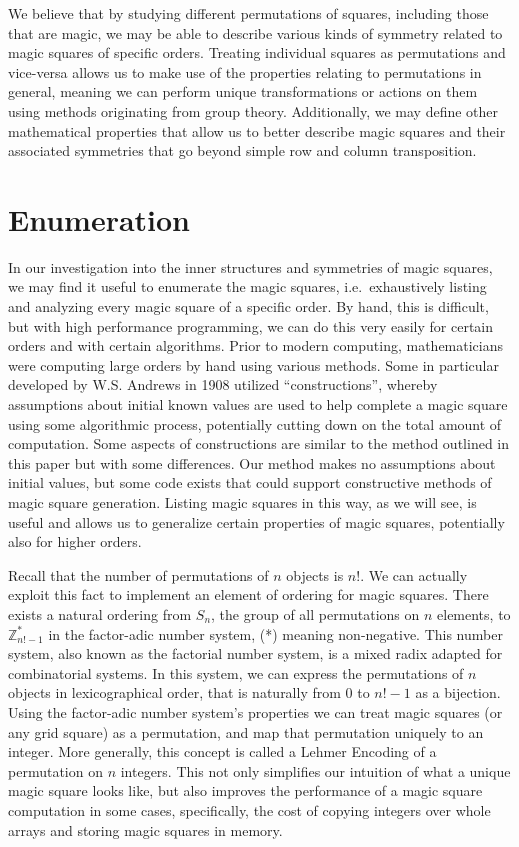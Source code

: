 \documentclass[12pt]{report}
\begin{document}
\par We believe that by studying different permutations of squares, including those that are magic,
we may be able to describe various kinds of symmetry related to magic squares of specific orders.
Treating individual squares as permutations and vice-versa allows us to make use of the properties
relating to permutations in general, meaning we can perform unique transformations or actions on
them using methods originating from group theory. Additionally, we may define other mathematical
properties that allow us to better describe magic squares and their associated symmetries that go
beyond simple row and column transposition.

\section{Enumeration}

\par In our investigation into the inner structures and symmetries of magic squares, we may find it
useful to enumerate the magic squares, i.e.\ exhaustively listing and analyzing every magic square
of a specific order. By hand, this is difficult, but with high performance programming, we can do
this very easily for certain orders and with certain algorithms. Prior to modern computing,
mathematicians were computing large orders by hand using various methods. Some in particular
developed by W.S. Andrews in 1908 utilized ``constructions'', whereby assumptions about initial
known values are used to help complete a magic square using some algorithmic process, potentially
cutting down on the total amount of computation\cite{Andrews}. Some aspects of constructions are
similar to the method outlined in this paper but with some differences. Our method makes no
assumptions about initial values, but some code exists that could support constructive methods of
magic square generation. Listing magic squares in this way, as we will see, is useful and allows us
to generalize certain properties of magic squares, potentially also for higher orders.

\par Recall that the number of permutations of $n$ objects is $n$!. We can actually exploit this
fact to implement an element of ordering for magic squares. There exists a natural ordering from
$S_n$, the group of all permutations on $n$ elements, to $\mathbb{Z}^{*}_{n!-1}$  in the
factor-adic number system, (*) meaning non-negative. This number system, also known as the
factorial number system, is a mixed radix adapted for combinatorial systems. In this system, we can
express the permutations of $n$ objects in lexicographical order, that is naturally from $0$ to
$n!-1$ as a bijection. Using the factor-adic number system's properties we can treat magic squares
(or any grid square) as a permutation, and map that permutation uniquely to an integer. More
generally, this concept is called a Lehmer Encoding of a permutation on $n$ integers\cite{Lehmer}.
This not only simplifies our intuition of what a unique magic square looks like, but also improves
the performance of a magic square computation in some cases, specifically, the cost of copying
integers over whole arrays and storing magic squares in memory.
\end{document}
